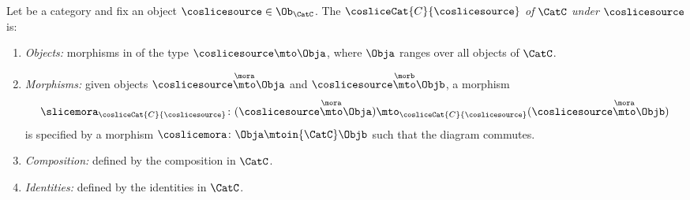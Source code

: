 \begin{ctdefinition}
\label{def:coslice-category}
   
    Let \CatC be a category and fix an object $\coslicesource \in \Ob_\CatC$. The  $\cosliceCat{C}{\coslicesource}$ \emph{of} $\CatC$ \emph{under} $\coslicesource$ is: 
    \begin{enumerate}
        \item \emph{Objects:} morphisms in \CatC of the type $\coslicesource \mto \Obja$, where $\Obja$ ranges over all objects of $\CatC$. 
        \item \emph{Morphisms:} given objects $\coslicesource \overset{\mora}{\mto} \Obja$ and $\coslicesource  \overset{\morb}{\mto} \Objb$, a morphism 
        \begin{equation}
\slicemora_{\cosliceCat{C}{\coslicesource}} \colon (\coslicesource \overset{\mora}{\mto} \Obja) \mto_{\cosliceCat{C}{\coslicesource}} (\coslicesource \overset{\mora}{\mto} \Objb)
\end{equation}
is specified by a morphism $\coslicemora \colon \Obja \mtoin{\CatC} \Objb$ such that the diagram
commutes. 

\item \emph{Composition:} defined by the composition in $\CatC$.  
\item \emph{Identities:} defined by the identities in $\CatC$. 
\end{enumerate}
\end{ctdefinition}



